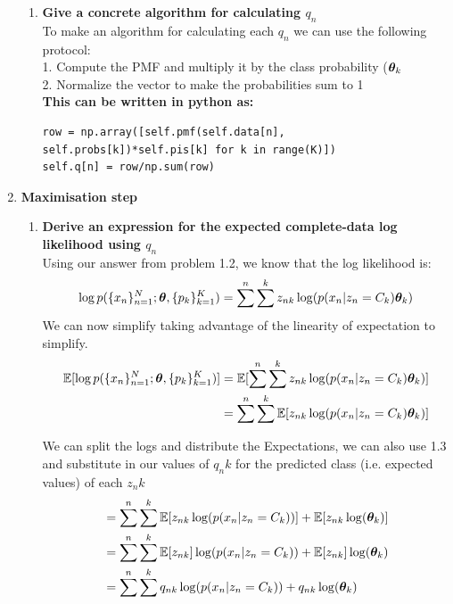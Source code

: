 \documentclass[submit]{harvardml}
\begin{document}
\begin{enumerate}
\begin{enumerate}
        \item \textbf{Give a concrete algorithm for calculating $q_n$}\\
        To make an algorithm for calculating each $q_n$ we can use the following protocol:\\
        1. Compute the PMF and multiply it by the class probability ($\boldsymbol{\theta}_k$\\
        2. Normalize the vector to make the probabilities sum to 1\\
        
        \textbf{This can be written in python as:}
\begin{verbatim}
row = np.array([self.pmf(self.data[n], self.probs[k])*self.pis[k] for k in range(K)])
self.q[n] = row/np.sum(row)
\end{verbatim}
        
    \end{enumerate}
    \item \textbf{Maximisation step}
    \begin{enumerate}
        \item \textbf{Derive an expression for the expected complete-data log likelihood using $q_n$}\\
        Using our answer from problem 1.2, we know that the log likelihood is:
        $$\log p(\{x_n\}^N_{n=1}; \boldsymbol{\theta}, \{p_k\}^K_{k = 1}) = \sum^n \sum^k z_{nk} \log  ( p(x_n| z_n = C_k) \boldsymbol{\theta}_k)$$
        We can now simplify taking advantage of the linearity of expectation to simplify.\\
        \begin{align*}
            \mathbb{E} [ \log p(\{x_n\}^N_{n=1}; \boldsymbol{\theta}, \{p_k\}^K_{k = 1})] &= \mathbb{E} [\sum^n \sum^k z_{nk} \log  ( p(x_n| z_n = C_k) \boldsymbol{\theta}_k)]\\
            &= \sum^n \sum^k \mathbb{E} [z_{nk}  \log  ( p(x_n| z_n = C_k) \boldsymbol{\theta}_k)]\\
        \end{align*}
        
        We can split the logs and distribute the Expectations, we can also use 1.3 and substitute in our values of $q_nk$ for the predicted class (i.e. expected values) of each $z_nk$\\
        \begin{align*}
            &= \sum^n \sum^k \mathbb{E} [z_{nk}  \log  ( p(x_n| z_n = C_k))] + \mathbb{E} [z_{nk}  \log( \boldsymbol{\theta}_k)]\\
            &= \sum^n \sum^k \mathbb{E} [z_{nk}]  \log  ( p(x_n| z_n = C_k)) + \mathbb{E} [z_{nk}]  \log( \boldsymbol{\theta}_k)\\
            &= \sum^n \sum^k q_{nk}  \log  ( p(x_n| z_n = C_k)) + q_{nk}  \log( \boldsymbol{\theta}_k)\\
        \end{align*}
        

\end{enumerate}
\end{enumerate}
\end{document}
